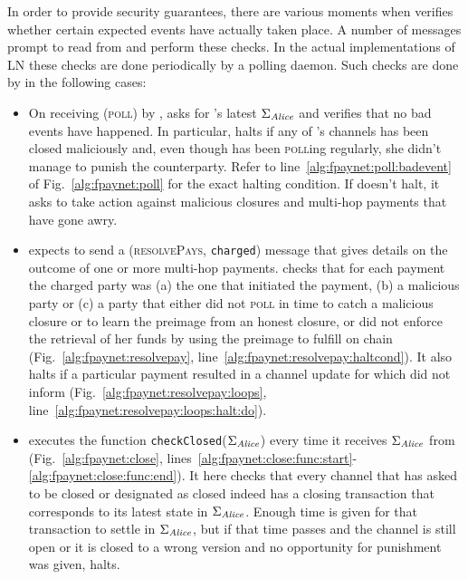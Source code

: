   In order to provide security guarantees, there are various moments when
  \fpaynet{} verifies whether certain expected events have actually taken place.
  A number of messages prompt \fpaynet{} to read from \ledger{} and perform
  these checks. In the actual implementations of LN these checks are done
  periodically by a polling daemon. Such checks are done by \fpaynet{} in the
  following cases:
  \begin{itemize}
    \item On receiving (\textsc{poll}) by \alice, \fpaynet{} asks \ledger{} for
    \alice's latest $\Sigma_{\mathit{Alice}}$ and verifies that no bad events have
    happened. In particular, \fpaynet{} halts if any of \alice's channels has
    been closed maliciously and, even though \alice{} has been \textsc{poll}ing
    regularly, she didn't manage to punish the counterparty. Refer to
    line~\ref{alg:fpaynet:poll:badevent} of Fig.~\ref{alg:fpaynet:poll} for the
    exact halting condition. If \fpaynet{} doesn't halt, it asks \simulator{} to
    take action against malicious closures and multi-hop payments that have gone
    awry.
    \item \fpaynet{} expects \simulator{} to send a (\textsc{resolvePays},
    \texttt{charged}) message that gives details on the outcome of one or more
    multi-hop payments. \fpaynet{} checks that for each payment the charged
    party was (a) the one that initiated the payment, (b) a malicious party or
    (c) a party that either did not \textsc{poll} in time to catch a malicious
    closure or to learn the preimage from an honest closure, or did not enforce
    the retrieval of her funds by using the preimage to fulfill on chain
    (Fig.~\ref{alg:fpaynet:resolvepay},
    line~\ref{alg:fpaynet:resolvepay:haltcond}). It also halts if a particular
    payment resulted in a channel update for which \simulator{} did not inform
    \fpaynet{} (Fig.~\ref{alg:fpaynet:resolvepay:loops},
    line~\ref{alg:fpaynet:resolvepay:loops:halt:do}).
    \item \fpaynet{} executes the function
    \texttt{checkClosed}($\Sigma_{\mathit{Alice}}$) every time it receives
    $\Sigma_{\mathit{Alice}}$ from \ledger{} (Fig.~\ref{alg:fpaynet:close},
    lines~\ref{alg:fpaynet:close:func:start}-\ref{alg:fpaynet:close:func:end}).
    It here checks that every channel that \environment{} has asked to be closed
    or \simulator{} designated as closed indeed has a closing transaction that
    corresponds to its latest state in $\Sigma_{\mathit{Alice}}$. Enough time is given
    for that transaction to settle in $\Sigma_{\mathit{Alice}}$, but if that time passes
    and the channel is still open or it is closed to a wrong version and no
    opportunity for punishment was given, \fpaynet{} halts.
  \end{itemize}

